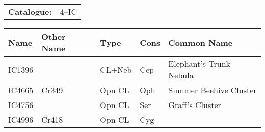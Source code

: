 \begin{tabular}{ p{0.9in} p{1.3in}}
{\bf Catalogue:} & 4--IC \\ 
\end{tabular}
\begin{longtable}{ p{0.7in}  p{1.0in}  p{0.6in}  p{0.9in}  p{5.1in} }
\hline 
{\bf Name} & {\bf Other Name} & {\bf Type} & {\bf Cons} & {\bf Common Name} \\ 
\hline 
IC1396 &  & CL+Neb & Cep & Elephant's Trunk Nebula \\ 
IC4665 & Cr349 & Opn CL & Oph & Summer Beehive Cluster \\ 
IC4756 &  & Opn CL & Ser & Graff's Cluster \\ 
IC4996 & Cr418 & Opn CL & Cyg &  \\ 
\hline 
\end{longtable} 
